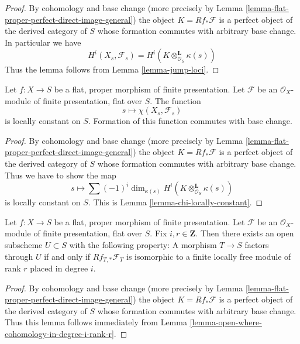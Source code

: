 \begin{proof}
By cohomology and base change (more precisely by
Lemma \ref{lemma-flat-proper-perfect-direct-image-general})
the object $K = Rf_*\mathcal{F}$ is a perfect object of the derived
category of $S$ whose formation commutes with arbitrary base change.
In particular we have
$$
H^i(X_s, \mathcal{F}_s) = H^i(K \otimes_{\mathcal{O}_S}^\mathbf{L} \kappa(s))
$$
Thus the lemma follows from
Lemma \ref{lemma-jump-loci}.
\end{proof}

\begin{lemma}
\label{lemma-chi-locally-constant-geometric}
Let $f : X \to S$ be a flat, proper morphism of finite presentation.
Let $\mathcal{F}$ be an $\mathcal{O}_X$-module of finite presentation,
flat over $S$. The function
$$
s \longmapsto \chi(X_s, \mathcal{F}_s)
$$
is locally constant on $S$. Formation of this function commutes with
base change.
\end{lemma}

\begin{proof}
By cohomology and base change (more precisely by
Lemma \ref{lemma-flat-proper-perfect-direct-image-general})
the object $K = Rf_*\mathcal{F}$ is a perfect object of the derived
category of $S$ whose formation commutes with arbitrary base change.
Thus we have to show the map
$$
s \longmapsto \sum (-1)^i \dim_{\kappa(s)}
H^i(K \otimes^\mathbf{L}_{\mathcal{O}_S} \kappa(s))
$$
is locally constant on $S$. This is Lemma \ref{lemma-chi-locally-constant}.
\end{proof}

\begin{lemma}
\label{lemma-open-where-cohomology-in-degree-i-rank-r-geometric}
Let $f : X \to S$ be a flat, proper morphism of finite presentation.
Let $\mathcal{F}$ be an $\mathcal{O}_X$-module of finite presentation,
flat over $S$. Fix $i, r \in \mathbf{Z}$.
Then there exists an open subscheme
$U \subset S$ with the following property:
A morphism $T \to S$ factors through $U$ if and only if
$Rf_{T, *}\mathcal{F}_T$ is isomorphic to a
finite locally free module of rank $r$ placed in degree $i$.
\end{lemma}

\begin{proof}
By cohomology and base change (more precisely by
Lemma \ref{lemma-flat-proper-perfect-direct-image-general})
the object $K = Rf_*\mathcal{F}$ is a perfect object of the derived
category of $S$ whose formation commutes with arbitrary base change.
Thus this lemma follows immediately from
Lemma \ref{lemma-open-where-cohomology-in-degree-i-rank-r}.
\end{proof}







